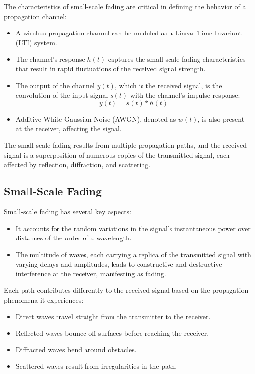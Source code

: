 The characteristics of small-scale fading are critical in defining the behavior of a propagation channel:

\begin{itemize}
    \item A wireless propagation channel can be modeled as a Linear Time-Invariant (LTI) system.
    \item The channel's response \( h(t) \) captures the small-scale fading characteristics that result in rapid fluctuations of the received signal strength.
    \item The output of the channel \( y(t) \), which is the received signal, is the convolution of the input signal \( s(t) \) with the channel's impulse response:
    \[
    y(t) = s(t) \ast h(t)
    \]
    \item Additive White Gaussian Noise (AWGN), denoted as \( w(t) \), is also present at the receiver, affecting the signal.
\end{itemize}

The small-scale fading results from multiple propagation paths, and the received signal is a superposition of numerous copies of the transmitted signal, each affected by reflection, diffraction, and scattering.
\subsection*{Small-Scale Fading}

Small-scale fading has several key aspects:

\begin{itemize}
    \item It accounts for the random variations in the signal's instantaneous power over distances of the order of a wavelength.
    \item The multitude of waves, each carrying a replica of the transmitted signal with varying delays and amplitudes, leads to constructive and destructive interference at the receiver, manifesting as fading.
\end{itemize}

Each path contributes differently to the received signal based on the propagation phenomena it experiences:

\begin{itemize}
    \item Direct waves travel straight from the transmitter to the receiver.
    \item Reflected waves bounce off surfaces before reaching the receiver.
    \item Diffracted waves bend around obstacles.
    \item Scattered waves result from irregularities in the path.
\end{itemize}

